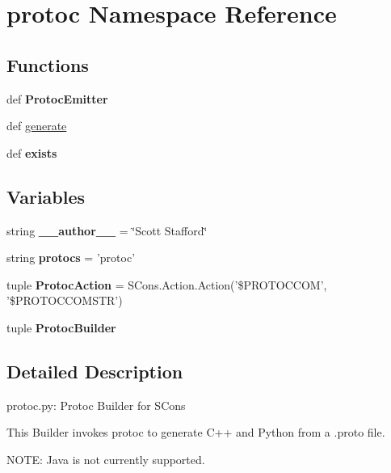 \hypertarget{namespaceprotoc}{
\section{protoc Namespace Reference}
\label{namespaceprotoc}
}
\subsection*{Functions}
\begin{DoxyCompactItemize}
\item 
\hypertarget{namespaceprotoc_ac5ef9b333395b77ebcb0fa68a1e61957}{
def {\bfseries ProtocEmitter}}
\label{namespaceprotoc_ac5ef9b333395b77ebcb0fa68a1e61957}

\item 
def \hyperlink{namespaceprotoc_ad49cf73a0ff7f84b18cbcfbf8d76de0d}{generate}
\item 
\hypertarget{namespaceprotoc_a69ac3d5198cf6e2a42f6256c12496a7e}{
def {\bfseries exists}}
\label{namespaceprotoc_a69ac3d5198cf6e2a42f6256c12496a7e}

\end{DoxyCompactItemize}
\subsection*{Variables}
\begin{DoxyCompactItemize}
\item 
\hypertarget{namespaceprotoc_a8a1414a27d710d2529c86329f46afc2f}{
string {\bfseries \_\-\_\-author\_\-\_\-} = \char`\"{}Scott Stafford\char`\"{}}
\label{namespaceprotoc_a8a1414a27d710d2529c86329f46afc2f}

\item 
\hypertarget{namespaceprotoc_a5bed9469eabb09ba16894fb1248a5a8b}{
string {\bfseries protocs} = 'protoc'}
\label{namespaceprotoc_a5bed9469eabb09ba16894fb1248a5a8b}

\item 
\hypertarget{namespaceprotoc_ae8b1ca3d2ced7243684a0e4e444c1167}{
tuple {\bfseries ProtocAction} = SCons.Action.Action('\$PROTOCCOM', '\$PROTOCCOMSTR')}
\label{namespaceprotoc_ae8b1ca3d2ced7243684a0e4e444c1167}

\item 
tuple {\bfseries ProtocBuilder}
\end{DoxyCompactItemize}


\subsection{Detailed Description}
\begin{DoxyVerb}
protoc.py: Protoc Builder for SCons

This Builder invokes protoc to generate C++ and Python 
from a .proto file.  

NOTE: Java is not currently supported.\end{DoxyVerb}
 


